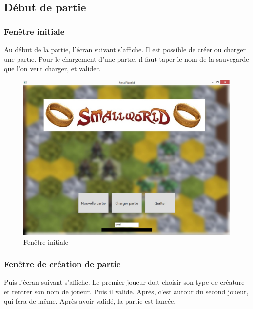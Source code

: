 \subsection{Début de partie}

\subsubsection{Fenêtre initiale}
Au début de la partie, l'écran suivant s'affiche. Il est possible de créer ou charger une partie. Pour le chargement d'une partie, il faut taper le nom de la sauvegarde que l'on veut charger, et valider.

\begin{figure}[ht!]
\centering
\includegraphics[scale=0.65]{img/init.jpg}
\caption{Fenêtre initiale}
\end{figure}
\newpage

\subsubsection{Fenêtre de création de partie}
Puis l'écran suivant s'affiche. Le premier joueur doit choisir son type de créature et rentrer son nom de joueur. Puis il valide. Après, c'est autour du second joueur, qui fera de même. Après avoir validé, la partie est lancée.

